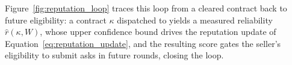 Figure~\ref{fig:reputation_loop} traces this loop from a cleared contract
back to future eligibility: a contract $\kappa$ dispatched to
\NoesisServer{} yields a measured reliability $\hat r(\kappa, W)$, whose
upper confidence bound drives the reputation update of Equation~\eqref{eq:reputation_update}, and
the resulting score gates the seller's eligibility to submit asks in
future \NoesisMarket{} rounds, closing the loop.

% 
% 
% 
% 
